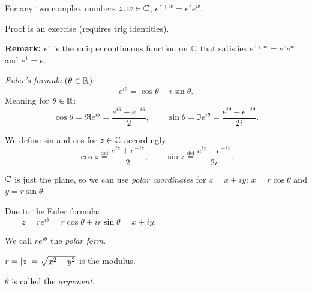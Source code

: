 \documentclass[10pt,aspectratio=169]{beamer}
\begin{document}
\begin{frame}
\begin{proposition}
For any two complex numbers $z,w \in {\mathbb{C}}$,
$
e^{z+w} = e^z e^w .
$
\end{proposition}

Proof is an exercise (requires trig identities).

\medskip
\pause
\textbf{Remark:}  $e^z$ is the unique continuous
function on ${\mathbb{C}}$ that satisfies $e^{z+w} = e^z e^w$ and $e^1 = e$.

\pause
\medskip

\emph{Euler's formula} ($\theta \in {\mathbb{R}}$):
\begin{equation*}
e^{i\theta}
=
\cos \theta + i \sin \theta .
\end{equation*}
\pause
Meaning for $\theta \in {\mathbb{R}}$:
\begin{equation*}
\cos \theta = \Re e^{i\theta} = \frac{e^{i\theta}+e^{-i\theta}}{2} ,
\qquad
\sin \theta = \Im e^{i\theta} = \frac{e^{i\theta}-e^{-i\theta}}{2i} .
\end{equation*}

\pause
We define sin and cos for $z \in {\mathbb{C}}$ accordingly:
\begin{equation*}
\cos z \overset{\text{def}}{=} \frac{e^{iz}+e^{-iz}}{2} ,
\qquad
\sin z \overset{\text{def}}{=} \frac{e^{iz}-e^{-iz}}{2i} .
\end{equation*}

\end{frame}

\begin{frame}
${\mathbb{C}}$ is just the plane, so we can use \emph{polar coordinates} for $z=x+iy$:
$x = r \cos \theta$ and $y= r \sin \theta$.

\medskip
\pause
Due to the Euler formula:
\begin{equation*}
z = r e^{i\theta} = r\cos \theta + i r\sin \theta  = x+iy .
\qquad \qquad \qquad \qquad \qquad \qquad \qquad \qquad
\end{equation*}

\vspace*{-0.5in}
\hspace*{3.5in}{polarcoords.pdf_t}

\vspace*{-0.4in}

\pause

We call $re^{i \theta}$ the \emph{polar form}.

\pause
\medskip


$r = \lvert {z} \rvert = \sqrt{x^2+y^2}$ is the modulus.

\pause
\medskip

$\theta$ is called the \emph{argument}.

\end{frame}
\end{document}

